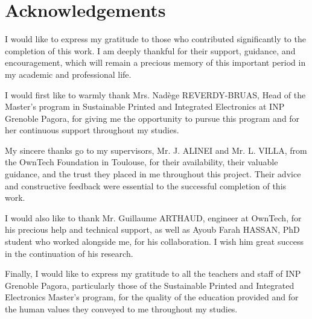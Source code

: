 \chapter*{Acknowledgements}

I would like to express my gratitude to those who contributed significantly to the completion of this work. I am deeply thankful for their support, guidance, and encouragement, which will remain a precious memory of this important period in my academic and professional life.

\vspace{0.4cm}

I would first like to warmly thank Mrs. Nadège REVERDY-BRUAS, Head of the Master's program in Sustainable Printed and Integrated Electronics at INP Grenoble Pagora, for giving me the opportunity to pursue this program and for her continuous support throughout my studies.

\vspace{0.4cm}

My sincere thanks go to my supervisors, Mr. J. ALINEI and Mr. L. VILLA, from the OwnTech Foundation in Toulouse, for their availability, their valuable guidance, and the trust they placed in me throughout this project. Their advice and constructive feedback were essential to the successful completion of this work.

\vspace{0.4cm}

I would also like to thank Mr. Guillaume ARTHAUD, engineer at OwnTech, for his precious help and technical support, as well as Ayoub Farah HASSAN, PhD student who worked alongside me, for his collaboration. I wish him great success in the continuation of his research.

\vspace{0.4cm}

Finally, I would like to express my gratitude to all the teachers and staff of INP Grenoble Pagora, particularly those of the Sustainable Printed and Integrated Electronics Master's program, for the quality of the education provided and for the human values they conveyed to me throughout my studies.